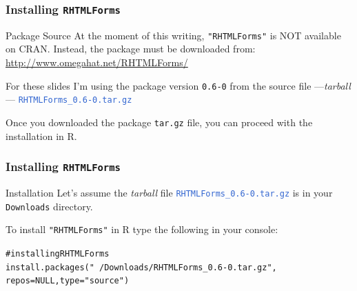 \documentclass{beamer}\usepackage[]{graphicx}\usepackage[]{color}
\makeatletter
\newcommand{\hlstr}[1]{\textcolor[rgb]{0.063,0.58,0.627}{#1}}%
\newcommand{\hlcom}[1]{\textcolor[rgb]{0.588,0.588,0.588}{#1}}%
\newcommand{\hlstd}[1]{\textcolor[rgb]{0.196,0.196,0.196}{#1}}%
\newcommand{\hlkwa}[1]{\textcolor[rgb]{0.231,0.416,0.784}{#1}}%
\newcommand{\hlkwc}[1]{\textcolor[rgb]{0,0.631,0.314}{#1}}%
\newcommand{\hlkwd}[1]{\textcolor[rgb]{0.78,0.227,0.412}{#1}}%
\newenvironment{kframe}{%
 \def\at@end@of@kframe{}%
 \ifinner\ifhmode%
  \def\at@end@of@kframe{\end{minipage}}%
  \begin{minipage}{\columnwidth}%
 \fi\fi%
 \def\FrameCommand##1{\hskip\@totalleftmargin \hskip-\fboxsep
 \colorbox{shadecolor}{##1}\hskip-\fboxsep
     \hskip-\linewidth \hskip-\@totalleftmargin \hskip\columnwidth}%
 \MakeFramed {\advance\hsize-\width
   \@totalleftmargin\z@ \linewidth\hsize
   \@setminipage}}%
 {\par\unskip\endMakeFramed%
 \at@end@of@kframe}
\newenvironment{knitrout}{}{} %
\newcommand{\code}[1]{\texttt{#1}}
\newcommand{\low}[1]{\textcolor{lowlight}{#1}}
\newcommand{\highcode}[1]{\textcolor{highlight}{\texttt{#1}}}
\makeatother
\begin{document}
\begin{frame}[fragile]
\frametitle{Installing \code{RHTMLForms}}

\begin{block}{Package Source}
At the moment of this writing, \code{"RHTMLForms"} is NOT available on CRAN. Instead, the package must be downloaded from: \\
{\footnotesize \url{http://www.omegahat.net/RHTMLForms/}}

\bigskip

For these slides I'm using the package version \code{0.6-0} from the source file ---\textit{tarball}--- \highcode{RHTMLForms\_0.6-0.tar.gz}

\bigskip

\low{Once you downloaded the package \code{tar.gz} file, you can proceed with the installation in R.}
\end{block}

\end{frame}


\begin{frame}[fragile]
\frametitle{Installing \code{RHTMLForms}}

\begin{block}{Installation}
Let's assume the \textit{tarball} file \highcode{RHTMLForms\_0.6-0.tar.gz} is in your \code{Downloads} directory. 

\bigskip

To install \code{"RHTMLForms"} in R type the following in your console:
\begin{knitrout}\footnotesize
{}\color{fgcolor}\begin{kframe}
\begin{alltt}
\hlcom{# installing RHTMLForms}
\hlkwd{install.packages}\hlstd{(}\hlstr{"~/Downloads/RHTMLForms_0.6-0.tar.gz"}\hlstd{,}
                 \hlkwc{repos} \hlstd{=} \hlkwa{NULL}\hlstd{,} \hlkwc{type} \hlstd{=} \hlstr{"source"}\hlstd{)}
\end{alltt}
\end{kframe}
\end{knitrout}
\end{block}

\end{frame}

\end{document}
